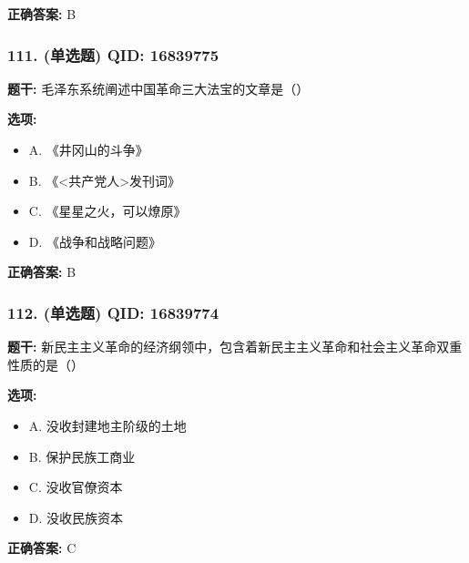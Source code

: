\documentclass[12pt,UTF8]{ctexart}
\begin{document}
\textbf{正确答案:}
B

\vspace{0.3em}\hrulefill\vspace{0.7em}

\subsubsection*{111. (单选题) \small QID: 16839775}

\textbf{题干:}
毛泽东系统阐述中国革命三大法宝的文章是（）

\textbf{选项:}
\begin{itemize}[leftmargin=*]

  \item A. 《井冈山的斗争》

  \item B. 《<共产党人>发刊词》

  \item C. 《星星之火，可以燎原》

  \item D. 《战争和战略问题》

\end{itemize}

\textbf{正确答案:}
B

\vspace{0.3em}\hrulefill\vspace{0.7em}

\subsubsection*{112. (单选题) \small QID: 16839774}

\textbf{题干:}
新民主主义革命的经济纲领中，包含着新民主主义革命和社会主义革命双重性质的是（）

\textbf{选项:}
\begin{itemize}[leftmargin=*]

  \item A. 没收封建地主阶级的土地

  \item B. 保护民族工商业

  \item C. 没收官僚资本

  \item D. 没收民族资本

\end{itemize}

\textbf{正确答案:}
C

\vspace{0.3em}\hrulefill\vspace{0.7em}
\end{document}
